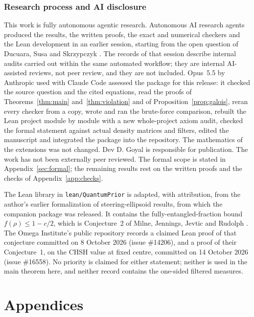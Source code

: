 \documentclass[11pt]{article}
\theoremstyle{remark}\newtheorem{remark}[theorem]{Remark}
\begin{document}



\section{Research process and AI disclosure}\label{sec:disclosure}

This work is fully autonomous agentic research. Autonomous AI research
agents produced the results, the written proofs, the exact and numerical
checkers and the Lean development in an earlier session, starting from the
open question of Ducuara, Susa and Skrzypczyk \cite{ducuara}. The records
of that session describe internal audits carried out within the same
automated workflow; they are internal AI-assisted reviews, not peer review,
and they are not included. Opus~5.5 by Anthropic used with Claude Code
assessed the package for this release: it checked the source question and
the cited equations, read the proofs of Theorems~\ref{thm:main}
and~\ref{thm:violation} and of Proposition~\ref{prop:galois}, reran every
checker from a copy, wrote and ran the brute-force comparison, rebuilt the
Lean project module by module with a new whole-project axiom audit, checked
the formal statement against actual density matrices and filters, edited
the manuscript and integrated the package into the repository. The
mathematics of the extensions was not changed. Dev D. Goyal is responsible
for publication. The work has not been externally peer reviewed. The formal
scope is stated in Appendix~\ref{sec:formal}; the remaining results rest on
the written proofs and the checks of Appendix~\ref{app:checks}.

The Lean library in \texttt{lean/QuantumPrior} is adapted, with
attribution, from the author's earlier formalization of steering-ellipsoid
results, from which the companion package \cite{steeringbounds} was
released. It contains the fully-entangled-fraction bound
$f(\rho)\leq1-c/2$, which is Conjecture~2 of Milne, Jennings, Jevtic and
Rudolph \cite{milnemaxmixed}. The Omega Institute's public repository
records a claimed Lean proof of that conjecture committed on 8 October 2026
(issue \#14206), and a proof of their Conjecture~1, on the CHSH value at
fixed centre, committed on 14 October 2026 (issue \#16558). No priority is
claimed for either statement; neither is used in the main theorem here, and
neither record contains the one-sided filtered measures.

\appendix
\part*{Appendices}
\end{document}
